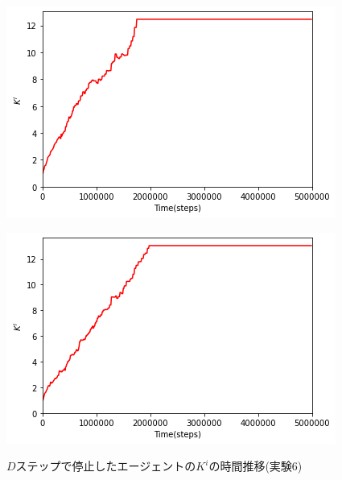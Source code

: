 \documentclass[12pt,a4j,twoside]{jarticle}
\begin{document}
  \begin{figure}
    \begin{minipage}{0.48\hsize}
      \centering
      \includegraphics[width=0.99\hsize]{figures/CorrectionTransition_TimeStop_18.png}
      \label{subfig:transition_time_18}
    \end{minipage}
    \hfill
    \begin{minipage}{0.48\hsize}
      \centering
      \includegraphics[width=0.99\hsize]{figures/CorrectionTransition_TimeStop_7.png}
      \label{subfig:transition_time_7}
    \end{minipage}
    \caption{$D$ステップで停止したエージェントの$K^i$の時間推移(実験6)}
    \label{fig:transition_early_time}
  \vspace{12pt}
    \begin{minipage}{0.48\hsize}
      \centering

\end{minipage}
\end{figure}
\end{document}
